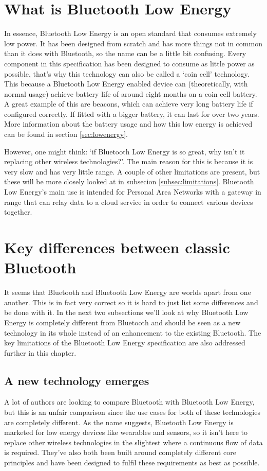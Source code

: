 \documentclass[pdftex,a4paper,12pt,twoside]{report}
\begin{document}
\newpage{}

\section{What is Bluetooth Low Energy}
\label{sec:whatis}
In essence, Bluetooth Low Energy is an open standard that consumes extremely low power. It has been designed from scratch and has more things not in common than it does with Bluetooth, so the name can be a little bit confusing. Every component in this specification has been designed to consume as little power as possible, that's why this technology can also be called a `coin cell' technology. This because a Bluetooth Low Energy enabled device can (theoretically, with normal usage) achieve battery life of around eight months on a coin cell battery. A great example of this are beacons, which can achieve very long battery life if configured correctly. If fitted with a bigger battery, it can last for over two years. More information about the battery usage and how this low energy is achieved can be found in section \ref{sec:lowenergy}.

However, one might think: `if Bluetooth Low Energy is so great, why isn't it replacing other wireless technologies?'. The main reason for this is because it is very slow and has very little range. A couple of other limitations are present, but these will be more closely looked at in subsecion \ref{subsec:limitations}. Bluetooth Low Energy's main use is intended for Personal Area Networks with a gateway in range that can relay data to a cloud service in order to connect various devices together.

\section{Key differences between classic Bluetooth}
\label{sec:differencesclassic}
It seems that Bluetooth and Bluetooth Low Energy are worlds apart from one another. This is in fact very correct so it is hard to just list some differences and be done with it. In the next two subsections we'll look at why Bluetooth Low Energy is completely different from Bluetooth and should be seen as a new technology in its whole instead of an enhancement to the existing Bluetooth. The key limitations of the Bluetooth Low Energy specification are also addressed further in this chapter.

\subsection{A new technology emerges}
\label{subsec:newtechnology}
A lot of authors are looking to compare Bluetooth with Bluetooth Low Energy, but this is an unfair comparison since the use cases for both of these technologies are completely different. As the name suggests, Bluetooth Low Energy is marketed for low energy devices like wearables and sensors, so it isn't here to replace other wireless technologies in the slightest where a continuous flow of data is required. They've also both been built around completely different core principles and have been designed to fulfil these requirements as best as possible.
\end{document}
